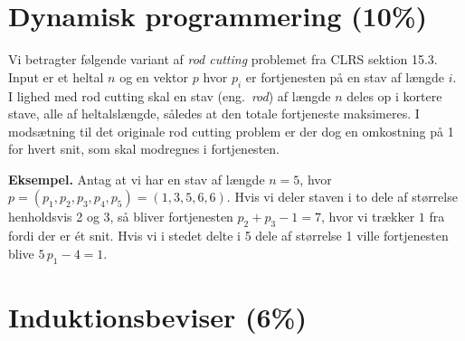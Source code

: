 \section{Dynamisk programmering (10\%)}

Vi betragter følgende variant af \emph{rod cutting} problemet fra CLRS sektion 15.3.
Input er et heltal $n$ og en vektor $p$ hvor $p_i$ er fortjenesten på en stav af længde $i$.
I lighed med rod cutting skal en stav (eng.~\emph{rod}) af længde $n$ deles op i kortere stave, alle af heltalslængde, således at den totale fortjeneste maksimeres.
I modsætning til det originale rod cutting problem er der dog en omkostning på 1 for hvert snit, som skal modregnes i fortjenesten.

\medskip

{\bf Eksempel.} Antag at vi har en stav af længde $n=5$, hvor $p = (p_1,p_2,p_3,p_4,p_5) = (1,3,5,6,6)$. Hvis vi deler staven i to dele af størrelse henholdsvis 2 og 3, så bliver fortjenesten $p_2 + p_3 - 1 = 7$, hvor vi trækker $1$ fra fordi der er ét snit. Hvis vi i stedet delte i 5 dele af størrelse 1 ville fortjenesten blive $5\,p_1 - 4 = 1$.








\section{Induktionsbeviser (6\%)}

